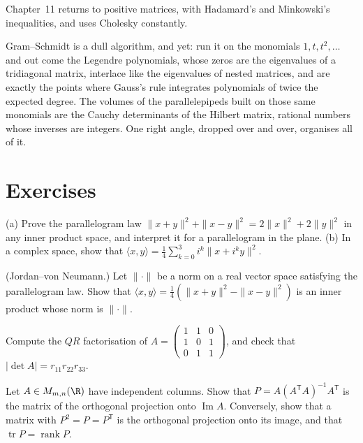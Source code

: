 Chapter~11 returns to positive matrices, with Hadamard's and Minkowski's inequalities, and uses Cholesky constantly.

\begin{beauty}
Gram--Schmidt is a dull algorithm, and yet: run it on the monomials $1,t,t^2,\dots$ and out come the Legendre
polynomials, whose zeros are the eigenvalues of a tridiagonal matrix, interlace like the eigenvalues of nested
matrices, and are exactly the points where Gauss's rule integrates polynomials of twice the expected degree. The volumes
of the parallelepipeds built on those same monomials are the Cauchy determinants of the Hilbert matrix, rational numbers
whose inverses are integers. One right angle, dropped over and over, organises all of it.
\end{beauty}

\section{Exercises}

\begin{exercise}[$\star$]\label{ex:polar}
(a) Prove the parallelogram law $\|x+y\|^2+\|x-y\|^2=2\|x\|^2+2\|y\|^2$ in any inner product space, and interpret it for
a parallelogram in the plane. (b) In a complex space, show that $\langle x,y\rangle=\frac14\sum_{k=0}^3i^k\|x+i^ky\|^2$.
\end{exercise}

\begin{exercise}[$\star\star\star$]\label{ex:jvn}
(Jordan--von Neumann.) Let $\|\cdot\|$ be a norm on a real vector space satisfying the parallelogram law. Show that
$\langle x,y\rangle=\frac14(\|x+y\|^2-\|x-y\|^2)$ is an inner product whose norm is $\|\cdot\|$.
\end{exercise}

\begin{exercise}[$\star$]\label{ex:qr}
Compute the $QR$ factorisation of
$A=\begin{pmatrix}1&1&0\\1&0&1\\0&1&1\end{pmatrix}$, and check that $|\det A|=r_{11}r_{22}r_{33}$.
\end{exercise}

\begin{exercise}[$\star$]\label{ex:projmatrix}
Let $A\in M_{m,n}(\R)$ have independent columns. Show that $P=A(A^{\mathsf T}A)^{-1}A^{\mathsf T}$ is the matrix of the
orthogonal projection onto $\operatorname{Im}A$. Conversely, show that a matrix with $P^2=P=P^{\mathsf T}$ is the
orthogonal projection onto its image, and that $\operatorname{tr}P=\operatorname{rank}P$.
\end{exercise}

